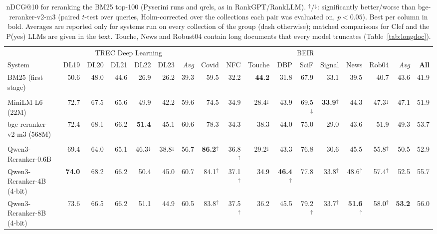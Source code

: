 \begin{table}
\centering
\footnotesize
\setlength{\tabcolsep}{2.1pt}
\caption{nDCG@10 for reranking the BM25 top-100 (Pyserini runs and qrels, as in RankGPT/RankLLM). $^\uparrow$/$^\downarrow$: significantly better/worse than bge-reranker-v2-m3 (paired $t$-test over queries, Holm-corrected over the collections each pair was evaluated on, $p<0.05$). Best per column in bold. Averages are reported only for systems run on every collection of the group (dash otherwise); matched comparisons for Clef and the P(yes) LLMs are given in the text. Touche, News and Robust04 contain long documents that every model truncates (Table~\ref{tab:longdoc}).}
\label{tab:ranking-full}
\begin{tabular}{lrrrrr|r|rrrrrrrr|r|r}
\toprule
 & \multicolumn{6}{c|}{TREC Deep Learning} & \multicolumn{9}{c|}{BEIR} & \\
System & DL19 & DL20 & DL21 & DL22 & DL23 & \textit{Avg} & Covid & NFC & Touche & DBP & SciF & Signal & News & Rob04 & \textit{Avg} & \textbf{All} \\
\midrule
BM25 (first stage) & 50.6 & 48.0 & 44.6 & 26.9 & 26.2 & 39.3 & 59.5 & 32.2 & \textbf{44.2} & 31.8 & 67.9 & 33.1 & 39.5 & 40.7 & 43.6 & 41.9 \\
\addlinespace[1pt]
\multicolumn{17}{l}{\textit{Cross-encoders}} \\
MiniLM-L6 (22M) & 72.7 & 67.5 & 65.6 & 49.9 & 42.2 & 59.6 & 74.5 & 34.9 & 28.4$^\downarrow$ & 43.9 & 69.5$^\downarrow$ & \textbf{33.9}$^\uparrow$ & 44.3 & 47.3$^\downarrow$ & 47.1 & 51.9 \\
bge-reranker-v2-m3 (568M) & 72.4 & 68.1 & 66.2 & \textbf{51.4} & 45.1 & 60.6 & 78.3 & 34.3 & 38.3 & 44.0 & 75.0 & 29.0 & 43.6 & 51.9 & 49.3 & 53.7 \\
\addlinespace[1pt]
\multicolumn{17}{l}{\textit{Label-probability LLM rerankers}} \\
Qwen3-Reranker-0.6B & 69.4 & 64.0 & 65.1 & 46.3$^\downarrow$ & 38.8$^\downarrow$ & 56.7 & \textbf{86.2}$^\uparrow$ & 36.8$^\uparrow$ & 29.2$^\downarrow$ & 43.3 & 76.8 & 30.6 & 45.5 & 55.8$^\uparrow$ & 50.5 & 52.9 \\
Qwen3-Reranker-4B (4-bit) & \textbf{74.0} & 68.2 & 66.2 & 50.4 & 45.0 & 60.7 & 84.1$^\uparrow$ & 37.1$^\uparrow$ & 34.9 & \textbf{46.4}$^\uparrow$ & 77.8 & 33.8$^\uparrow$ & 48.6$^\uparrow$ & 57.4$^\uparrow$ & 52.5 & 55.7 \\
Qwen3-Reranker-8B (4-bit) & 73.6 & 66.5 & 66.2 & 51.1 & 44.9 & 60.5 & 83.8$^\uparrow$ & 37.5$^\uparrow$ & 36.2 & 45.5 & 79.2$^\uparrow$ & 33.7$^\uparrow$ & \textbf{51.6}$^\uparrow$ & 58.0$^\uparrow$ & \textbf{53.2} & 56.0 \\

\end{tabular}
\end{table}
